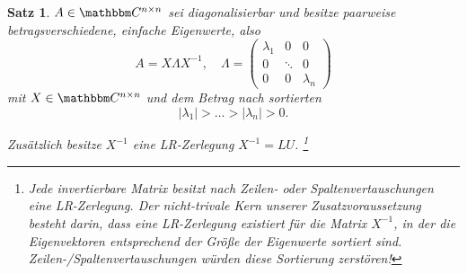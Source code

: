 \documentclass[12pt,a4paper]{book}
\theoremstyle{break}
\newtheorem{theorem}{Satz}[chapter]
\theoremstyle{nonumberplain}
\newcommand{\C}{\mathbbm C}
\newcommand{\1}{\mathbbm{1}} 			      	%
\begin{document}
\begin{theorem}\label{satz:QR}
$A\in \C^{n\times n}$ sei diagonalisierbar und besitze paarweise betragsverschiedene, einfache Eigenwerte, also
\[
A=X \Lambda X^{-1}, \quad \Lambda=\begin{pmatrix} \lambda_1 & 0 & 0\\ 0 & \ddots & 0\\ 0 & 0 & \lambda_n\end{pmatrix}
\]
mit
$X\in \C^{n\times n}$ und dem Betrag nach sortierten 
\[
|\lambda_1|>\ldots>|\lambda_n| >0.
\]

Zusätzlich besitze $X^{-1}$ eine LR-Zerlegung $X^{-1}=LU$.
\footnote{
Jede invertierbare Matrix besitzt nach Zeilen- oder Spaltenvertauschungen eine LR-Zerlegung. 
Der nicht-trivale Kern unserer Zusatzvoraussetzung besteht darin, dass eine LR-Zerlegung existiert für die Matrix $X^{-1}$, in der die Eigenvektoren entsprechend der Größe der Eigenwerte sortiert sind. Zeilen-/Spaltenvertauschungen würden diese Sortierung zerstören!}
\end{theorem}
\end{document}
